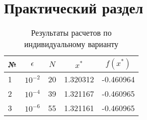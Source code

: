 \chapter{Практический раздел}


\begin{table}[h!]
    \caption{Результаты расчетов по индивидуальному варианту}
    \label{tab:results}
    \begin{tabular}{|l|l|r|r|r|}
    \hline
    \multicolumn{1}{|c|}{№} & \multicolumn{1}{c|}{\textbf{$\epsilon$}} & \multicolumn{1}{c|}{$N$} & \multicolumn{1}{c|}{\textbf{$x^{*}$}} & \multicolumn{1}{c|}{\textbf{$f(x^{*})$}} \\ \hline
    1                                & $10^{-2}$                                             & 20                              & 1.320312                              & -0.460964                                \\ \hline
    2                                & $10^{-4}$                                             & 39                              & 1.321167                              & -0.460965                                \\ \hline
    3                                & $10^{-6}$                                             & 55                              & 1.321161                              & -0.460965                                \\ \hline
    \end{tabular}
    \end{table}